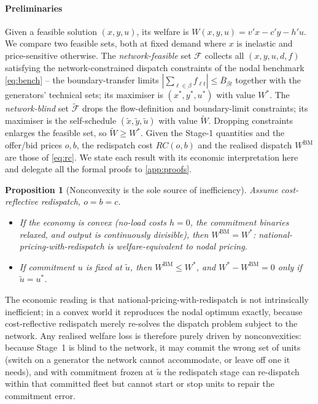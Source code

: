 \documentclass[review,3p,times]{elsarticle}
\theoremstyle{plain}
\newtheorem{proposition}{Proposition}
\theoremstyle{definition}
\begin{document}
\paragraph{Preliminaries} Given a feasible solution $(x,y,u)$, its welfare is $W(x,y,u)=v'x-c'y-h'u$. We compare two
feasible sets, both at fixed demand where $x$ is inelastic and price-sensitive
otherwise. The \emph{network-feasible} set $\mathcal F$ collects all
$(x,y,u,d,f)$ satisfying the network-constrained dispatch constraints of the nodal
benchmark \eqref{eq:bench} -- the boundary-transfer
limits $|\!\sum_{\ell\in\beta}f_{\ell t}|\le\overline B_{\beta t}$ together with
the generators' technical sets; its maximiser
is $(x^\ast,y^\ast,u^\ast)$ with value $W^\ast$. The \emph{network-blind} set
$\tilde{\mathcal F}$ drops the flow-definition and boundary-limit constraints; its
maximiser is the self-schedule $(\tilde x,\tilde y,\tilde u)$ with value
$\tilde W$. Dropping constraints enlarges the feasible set, so
$\tilde W\ge W^\ast$. Given the Stage-1 quantities and the offer/bid prices
$o,b$, the redispatch cost $RC(o,b)$ and the realised dispatch
$W^{\mathrm{BM}}$ are those of \eqref{eq:rc}. We state each result with its
economic interpretation here and delegate all  the formal proofs to \ref{app:proofs}.

\begin{proposition}[Nonconvexity is the sole source of inefficiency]
\label{prop:p1}
Assume cost-reflective redispatch, $o=b=c$.
\begin{itemize}
\item[\emph{(i)}] If the economy is convex (no-load costs $h=0$, the commitment
binaries relaxed,  and output is continuously divisible), then
$W^{\mathrm{BM}}=W^\ast$: national-pricing-with-redispatch is welfare-equivalent
to nodal pricing.
\item[\emph{(ii)}] If commitment $u$ is fixed at $\tilde u$, then $W^{\mathrm{BM}}\le W^\ast$, and
$W^\ast-W^{\mathrm{BM}}=0$ only if $\tilde u= u^\ast$.
\end{itemize}
\end{proposition}

The economic reading is that national-pricing-with-redispatch is not
intrinsically inefficient; in a convex world it reproduces the nodal optimum
exactly, because cost-reflective redispatch merely re-solves the dispatch problem
subject to the network. Any realised welfare loss is therefore  purely driven by
nonconvexities: because Stage~1 is blind to the network, it may commit the
wrong set of units (switch on a generator the network cannot accommodate, or
leave off one it needs), and with commitment frozen at $\tilde u$ the redispatch
stage can re-dispatch within that committed fleet but cannot start or stop units
to repair the commitment error.
\end{document}
